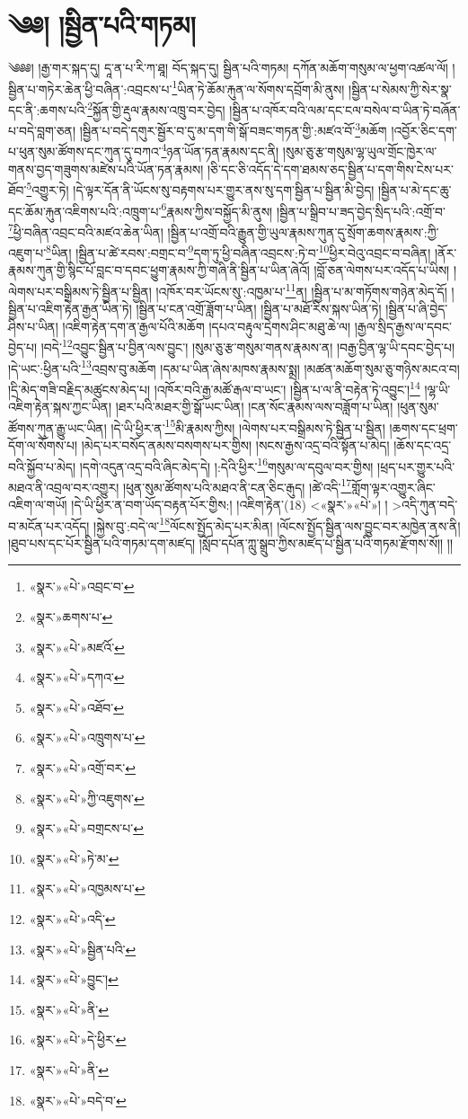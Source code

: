 \chapter{༄༅། །སྦྱིན་པའི་གཏམ།}༄༅༅། །རྒྱ་གར་སྐད་དུ། དཱ་ན་པ་རི་ཀ་ཐཱ། བོད་སྐད་དུ། སྦྱིན་པའི་གཏམ། དཀོན་མཆོག་གསུམ་ལ་ཕྱག་འཚལ་ལོ། །སྦྱིན་པ་གཏེར་ཆེན་ཕྱི་བཞིན་:འབྲངས་པ་\footnote{«སྣར་»«པེ་»འབྲང་བ་}ཡིན་ཏེ་ཆོམ་རྐུན་ལ་སོགས་དབྲོག་མི་ནུས། །སྦྱིན་པ་སེམས་ཀྱི་སེར་སྣ་དང་ནི་:ཆགས་པའི་\footnote{«སྣར་»ཆགས་པ་}སྐྱོན་གྱི་རྡུལ་རྣམས་འཁྲུ་བར་བྱེད། །སྦྱིན་པ་འཁོར་བའི་ལམ་དང་ངལ་བསེལ་བ་ཡིན་ཏེ་བཞོན་པ་བདེ་བླག་ཅན། །སྦྱིན་པ་བདེ་དགུར་སྦྱོར་བ་དུ་མ་དག་གི་སྒོ་བཟང་གཏན་གྱི་:མཛའ་བོ་\footnote{«སྣར་»«པེ་»མཛའོ་}མཆོག །འབྱོར་ཅིང་དག་པ་ཕུན་སུམ་ཚོགས་དང་ཀུན་དུ་བཀའ་\footnote{«སྣར་»«པེ་»དཀའ་}ཉན་ཡོན་ཏན་རྣམས་དང་ནི། །སུམ་ཅུ་རྩ་གསུམ་ལྷ་ཡུལ་གྲོང་ཁྱེར་ལ་གནས་བྱད་གཟུགས་མཛེས་པའི་ཡོན་ཏན་རྣམས། །ཅི་དང་ཅི་འདོད་དེ་དག་ཐམས་ཅད་སྦྱིན་པ་དག་གིས་ངེས་པར་ཐོབ་\footnote{«སྣར་»«པེ་»འཐོབ་}འགྱུར་ཏེ། །དེ་ལྟར་དོན་ནི་ཡོངས་སུ་བརྟགས་པར་གྱུར་ནས་སུ་དག་སྦྱིན་པ་སྦྱིན་མི་བྱེད། །སྦྱིན་པ་མེ་དང་ཆུ་དང་ཆོམ་རྐུན་འཇིགས་པའི་:འཁྲུག་པ་\footnote{«སྣར་»«པེ་»འཁྲུགས་པ་}རྣམས་ཀྱིས་བསྐྱོད་མི་ནུས། །སྦྱིན་པ་སྒྲིབ་པ་ཟད་བྱེད་སྲིད་པའི་:འགྲོ་བ་\footnote{«སྣར་»«པེ་»འགྲོ་བར་}ཕྱི་བཞིན་འབྲང་བའི་མཛའ་ཆེན་ཡིན། །སྦྱིན་པ་འགྲོ་བའི་རྒྱུན་གྱི་ཡུལ་རྣམས་ཀུན་དུ་སྲོག་ཆགས་རྣམས་:ཀྱི་འཇུག་པ་\footnote{«སྣར་»«པེ་»ཀྱི་འཇུགས་}ཡིན། །སྦྱིན་པ་ཚེ་རབས་:བགྲང་བ་\footnote{«སྣར་»«པེ་»བགྲངས་པ་}དག་ཏུ་ཕྱི་བཞིན་འབྲངས་:ཏེ་བ་\footnote{«སྣར་»«པེ་»ཏེ་མ་}ཕྱིར་བེའུ་འབྲང་བ་བཞིན། །ནོར་རྣམས་ཀུན་གྱི་སྙིང་པོ་བླང་བ་དབང་ཕྱུག་རྣམས་ཀྱི་གཞི་ནི་སྦྱིན་པ་ཡིན་ཞེའོ། །བློ་ཅན་ལེགས་པར་འདོད་པ་ཡིས། །ལེགས་པར་བསྒྲིམས་ཏེ་སྦྱིན་པ་སྦྱིན། །འཁོར་བར་ཡོངས་སུ་:འཁྱམ་པ་\footnote{«སྣར་»«པེ་»འཁྱམས་པ་}ན། །སྦྱིན་པ་མ་གཏོགས་གཉེན་མེད་དོ། །སྦྱིན་པ་འཇིག་རྟེན་རྒྱན་ཡིན་ཏེ། །སྦྱིན་པ་ངན་འགྲོ་ཟློག་པ་ཡིན། །སྦྱིན་པ་མཐོ་རིས་སྐས་ཡིན་ཏེ། །སྦྱིན་པ་ཞི་བྱེད་ཤིས་པ་ཡིན། །འཇིག་རྟེན་དག་ན་རྒྱལ་པོའི་མཆོག །དཔའ་བརྟུལ་དྲེགས་ཤིང་མཐུ་ཆེ་ལ། །རྒྱལ་སྲིད་རྒྱས་ལ་དབང་བྱེད་པ། །བདེ་\footnote{«སྣར་»«པེ་»འདི་}འབྱུང་སྦྱིན་པ་བྱིན་ལས་བྱུང་། །སུམ་ཅུ་རྩ་གསུམ་གནས་རྣམས་ན། །བརྒྱ་བྱིན་ལྷ་ཡི་དབང་བྱེད་པ། །དེ་ཡང་:ཕྱིན་པའི་\footnote{«སྣར་»«པེ་»སྦྱིན་པའི་}འབྲས་བུ་མཆོག །དམ་པ་ཡིན་ཞེས་མཁས་རྣམས་སྨྲ། །མཚན་མཆོག་སུམ་ཅུ་གཉིས་མངའ་བ། །དྲི་མེད་གཟི་བརྗིད་མཚུངས་མེད་པ། །འཁོར་བའི་རྒྱ་མཚོ་རྒལ་བ་ཡང་། །སྦྱིན་པ་ལ་ནི་བརྟེན་ཏེ་འབྱུང་།\footnote{«སྣར་»«པེ་»བྱུང་།} །ལྷ་ཡི་འཇིག་རྟེན་སྐས་ཀྱང་ཡིན། །ཐར་པའི་མཐར་གྱི་སྒོ་ཡང་ཡིན། །ངན་སོང་རྣམས་ལས་བཟློག་པ་ཡིན། །ཕུན་སུམ་ཚོགས་ཀུན་རྒྱུ་ཡང་ཡིན། །དེ་ཡི་ཕྱིར་ན་\footnote{«སྣར་»«པེ་»ནི་}མི་རྣམས་ཀྱིས། །ལེགས་པར་བསྒྲིམས་ཏེ་སྦྱིན་པ་སྦྱིན། །ཆགས་དང་ཕྲག་དོག་ལ་སོགས་པ། །མེད་པར་བསོད་ནམས་བསགས་པར་གྱིས། །སངས་རྒྱས་འདྲ་བའི་སྟོན་པ་མེད། །ཆོས་དང་འདྲ་བའི་སྐྱོབ་པ་མེད། །དགེ་འདུན་འདྲ་བའི་ཞིང་མེད་དེ། །:དེའི་ཕྱིར་\footnote{«སྣར་»«པེ་»དེ་ཕྱིར་}གསུམ་ལ་དབུལ་བར་གྱིས། །ཕྲད་པར་གྱུར་པའི་མཐའ་ནི་འབྲལ་བར་འགྱུར། །ཕུན་སུམ་ཚོགས་པའི་མཐའ་ནི་ངན་ཅིང་རྒུད། །ཚེ་འདི་\footnote{«སྣར་»«པེ་»ནི་}གློག་ལྟར་འགྱུར་ཞིང་འཇིག་ལ་གཡོ། །དེ་ཡི་ཕྱིར་ན་བག་ཡོད་བརྟན་པོར་གྱིས:། །འཇིག་རྟེན་(18) <«སྣར་»«པེ་»། །
>འདི་ཀུན་བདེ་བ་མངོན་པར་འདོད། །སྐྱེས་བུ་:བདེ་ལ་\footnote{«སྣར་»«པེ་»བདེ་བ་}ལོངས་སྤྱོད་མེད་པར་མིན། །ལོངས་སྤྱོད་སྦྱིན་ལས་བྱུང་བར་མཁྱེན་ནས་ནི། །ཐུབ་པས་དང་པོར་སྦྱིན་པའི་གཏམ་དག་མཛད། །སློབ་དཔོན་ཀླུ་སྒྲུབ་ཀྱིས་མཛད་པ་སྦྱིན་པའི་གཏམ་རྫོགས་སོ།། །།